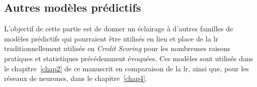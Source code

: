 %
%
%
%
%


\subsection{Autres modèles prédictifs}

L'objectif de cette partie est de donner un éclairage à d'autres familles de modèles prédictifs qui pourraient être utilisés en lieu et place de la \gls{lr} traditionnellement utilisée en \textit{Credit Scoring} pour les nombreuses raisons pratiques et statistiques précédemment évoquées. Ces modèles sont utilisés dans le chapitre~\ref{chap2} de ce manuscrit en comparaison de la \gls{lr}, ainsi que, pour les réseaux de neurones, dans le chapitre~\ref{chap4}.

